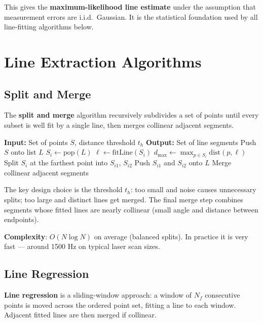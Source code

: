 \documentclass[11pt,a4paper]{article}
\theoremstyle{definition}
\theoremstyle{plain}
\theoremstyle{remark}
\begin{document}
This gives the \textbf{maximum-likelihood line estimate} under the assumption that measurement errors are i.i.d.\ Gaussian. It is the statistical foundation used by all line-fitting algorithms below.

\section{Line Extraction Algorithms}

\subsection{Split and Merge}

The \textbf{split and merge} algorithm recursively subdivides a set of points until every subset is well fit by a single line, then merges collinear adjacent segments.

\begin{algorithm}
\caption{Split and Merge}
\begin{algorithmic}
\STATE \textbf{Input:} Set of points $S$, distance threshold $t_h$
\STATE \textbf{Output:} Set of line segments
\STATE Push $S$ onto list $L$
    \STATE $S_i \leftarrow \mathrm{pop}(L)$
    \STATE $\ell \leftarrow \mathrm{fitLine}(S_i)$
    \STATE $d_{\max} \leftarrow \max_{p \in S_i} \mathrm{dist}(p, \ell)$
        \STATE Split $S_i$ at the farthest point into $S_{i1}$, $S_{i2}$
        \STATE Push $S_{i1}$ and $S_{i2}$ onto $L$
    \ENDIF
\ENDWHILE
\STATE Merge collinear adjacent segments
\end{algorithmic}
\end{algorithm}

The key design choice is the threshold $t_h$: too small and noise causes unnecessary splits; too large and distinct lines get merged. The final merge step combines segments whose fitted lines are nearly collinear (small angle and distance between endpoints).

\textbf{Complexity}: $O(N \log N)$ on average (balanced splits). In practice it is very fast — around 1500 Hz on typical laser scan sizes.

\subsection{Line Regression}

\textbf{Line regression} is a sliding-window approach: a window of $N_f$ consecutive points is moved across the ordered point set, fitting a line to each window. Adjacent fitted lines are then merged if collinear.
\end{document}
